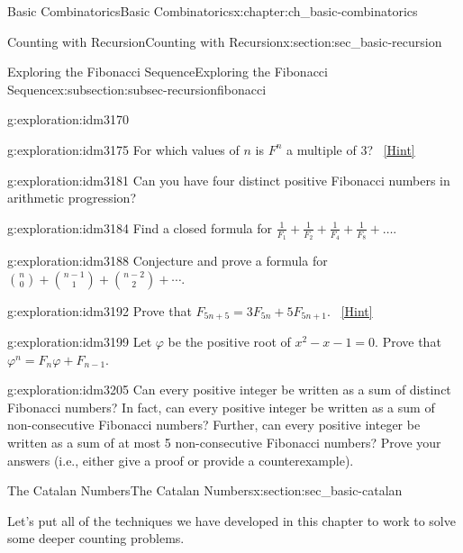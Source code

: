 \documentclass[oneside,10pt,]{book}
\numberwithin{equation}{chapter}
\begin{document}
\begin{chapterptx}{Basic Combinatorics}{}{Basic Combinatorics}{}{}{x:chapter:ch_basic-combinatorics}
\begin{sectionptx}{Counting with Recursion}{}{Counting with Recursion}{}{}{x:section:sec_basic-recursion}
\begin{subsectionptx}{Exploring the Fibonacci Sequence}{}{Exploring the Fibonacci Sequence}{}{}{x:subsection:subsec-recursionfibonacci}
\begin{exploration}{}{g:exploration:idm3170}
\end{exploration}
\begin{exploration}{}{g:exploration:idm3175}%
For which values of \(n\) is \(F^{n}\) a multiple of 3?%
\qquad~\hfill{\tiny\hyperlink{g:hint:idm3180-back}{[Hint]}}\end{exploration}
\begin{exploration}{}{g:exploration:idm3181}%
Can you have four distinct positive Fibonacci numbers in arithmetic progression?%
\end{exploration}
\begin{exploration}{}{g:exploration:idm3184}%
Find a closed formula for \(\frac{1}{F_{1}} + \frac{1}{F_{2}} + \frac{1}{F_{4}} + \frac{1}{F_{8}} + \ldots.\)%
\end{exploration}
\begin{exploration}{}{g:exploration:idm3188}%
Conjecture and prove a formula for \(\binom{n}{0} + \binom{n-1}{1} + \binom{n-2}{2} + \cdots\).%
\end{exploration}
\begin{exploration}{}{g:exploration:idm3192}%
Prove that \(F_{5n + 5} = 3F_{5n} + 5F_{5n + 1}\).%
\qquad~\hfill{\tiny\hyperlink{g:hint:idm3196-back}{[Hint]}}\end{exploration}
\begin{exploration}{}{g:exploration:idm3199}%
Let \(\varphi\) be the positive root of \(x^{2} - x - 1 = 0\). Prove that \(\varphi^{n} = F_{n}\varphi + F_{n - 1}\).%
\end{exploration}
\begin{exploration}{}{g:exploration:idm3205}%
Can every positive integer be written as a sum of distinct Fibonacci numbers?  In fact, can every positive integer be written as a sum of non-consecutive Fibonacci numbers?  Further, can every positive integer be written as a sum of at most 5 non-consecutive Fibonacci numbers?  Prove your answers (i.e., either give a proof or provide a counterexample).%
\end{exploration}
\end{subsectionptx}
\end{sectionptx}
%
%
\typeout{************************************************}
\typeout{************************************************}
%
\begin{sectionptx}{The Catalan Numbers}{}{The Catalan Numbers}{}{}{x:section:sec_basic-catalan}
\begin{introduction}{}%
Let's put all of the techniques we have developed in this chapter to work to solve some deeper counting problems.%

\end{introduction}
\end{sectionptx}
\end{chapterptx}
\end{document}
